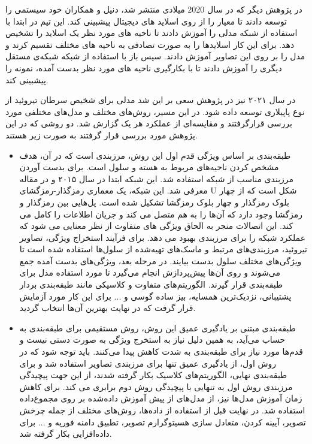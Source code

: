 در پژوهش دیگر \cite{elliott2020application} که در سال 2020 میلادی منتشر شد، دنیل و همکاران خود سیستمی را توسعه دادند تا معیار  را از روی اسلاید های دیجیتال پیشبینی کند. این تیم در ابتدا با استفاده از شبکه  مدلی را آموزش دادند تا ناحیه های مورد نظر یک اسلاید را تشخیص دهد. برای این کار اسلایدها را به صورت تصادفی به ناحیه های مختلف تقسیم کرند و مدل را بر روی این تصاویر آموزش دادند.
سپس باز با استفاده از شبکه  شبکه‌ی مستقل دیگری را آموزش دادند تا با بکارگیری ناحیه های مورد نظر بدست آمده،  نمونه را پیشبینی کند.



در سال ۲۰۲۱ نیز در پژوهش \cite{bohland2021machine} سعی بر این شد مدلی برای شخیص سرطان تیروئید از نوع پاپیلاری توسعه داده شود.
در این مسیر، روش‌های مختلف و مدل‌های مختلفی مورد بررسی قرارگرفتند و مقایسه‌ای از عملکرد هر یک گزارش شد.
دو روشی که در این پژوهش مورد بررسی قرار گرفتند به صورت زیر هستند.
\begin{itemize}
    \item طبقه‌بندی بر اساس ویژگی\newline
    قدم اول این روش، مرزبندی است که در آن، هدف مشخص کردن ناحیه‌های مربوط به هسته و سلول است.
    برای بدست آوردن مرزبندی مناسب از شبکه  استفاده شد. این شبکه ابتدا در سال ۲۰۱۵ و در مقاله \cite{ronneberger2015u} معرفی شد.
    این شبکه، یک معماری رمزگذار-رمزگشای U شکل است که از چهار بلوک رمزگذار و چهار بلوک رمزگشا تشکیل شده است.
    پل‌هایی بین رمزگذار و رمزگشا وجود دارد که آن‌ها را به هم متصل می کند و جریان اطلاعات را کامل می کند.
    این اتصالات منجر به الحاق ویژگی های متفاوت از نظر معنایی می شود که عملکرد شبکه را برای مرزبندی بهبود می دهد.
    برای فرآیند استخراج ویژگی، تصاویر تیروئید، مرزبندی‌های مرتبط و ماسک‌های تهیه‌شده از سلول‌ها استفاده شده است تا ویژگی‌های مختلف سلول بدست بیایند.
    در مرحله بعد، ویژگی‌های بدست آمده جمع می‌شوند و روی آن‌ها پیش‌پردازش انجام می‌گیرد تا مورد استفاده مدل برای طبقه‌بندی قرار گیرند. الگوریتم‌های متفاوت و کلاسیکی مانند طبقه‌بندی بردار پشتیبانی، نزدیک‌ترین همسایه، بیز ساده گوسی و ... برای این کار مورد آزمایش قرار گرفت که در نهایت بهترین آن‌ها انتخاب گردید.

    \item طبقه‌بندی مبتنی بر یادگیری عمیق\newline
    این روش، روش مستقیمی برای طبقه‌بندی به حساب می‌آید، به همین دلیل نیاز به استخرج ویژگی به صورت دستی نیست و قدم‌ها مورد نیاز برای طبقه‌بندی به شدت کاهش پیدا می‌کنند.
    باید توجه شود که در روش اول، از یادگیری عمیق تنها برای مرزبندی تصاویر استفاده شد و برای طیقه‌بندی نهایی، الگوریتم‌های کلاسیک بکار گرفته شدند، از این جهت پیچیدگی مرزبندی روش اول به تنهایی با پیچیدگی روش دوم برابری می کند.
    برای کاهش زمان آموزش مدل‌ها نیز، از مدل‌های از پیش آموزش داده‌شده بر روی مجموع‌داده \cite{deng2009imagenet} استفاده شد. در نهایت قبل از استفاده از داده‌ها، روش‌های مختلف از جمله چرخش تصویر، آیینه کردن، متعادل سازی هسیتوگرارم تصویر، تطبیق دامنه فوریه و ... برای داده‌افزایی بکار گرفته شد.
     

\end{itemize}
